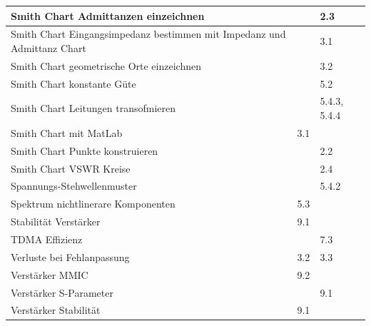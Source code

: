 \begin{tabular}{|l|l|l|}
\hline
Smith Chart Admittanzen einzeichnen &            &        2.3 \\
\hline
Smith Chart Eingangsimpedanz bestimmen mit Impedanz und Admittanz Chart &            &        3.1 \\
\hline
Smith Chart geometrische Orte einzeichnen  &            &        3.2 \\
\hline
Smith Chart konstante Güte &            &        5.2 \\
\hline
Smith Chart Leitungen transofmieren &            & 5.4.3, 5.4.4 \\
\hline
Smith Chart mit MatLab &        3.1 &            \\
\hline
Smith Chart Punkte konstruieren &            &        2.2 \\
\hline
Smith Chart VSWR Kreise &            &        2.4 \\
\hline
Spannungs-Stehwellenmuster &            &      5.4.2 \\
\hline
Spektrum nichtlinerare Komponenten &        5.3 &            \\
\hline
Stabilität Verstärker &        9.1 &            \\
\hline
TDMA Effizienz &            &        7.3 \\
\hline
Verluste bei Fehlanpassung &        3.2 &        3.3 \\
\hline
Verstärker MMIC &        9.2 &            \\
\hline
Verstärker S-Parameter &            &        9.1 \\
\hline
Verstärker Stabilität &        9.1 &            \\
\hline
\end{tabular}  
\renewcommand{\arraystretch}{1}


